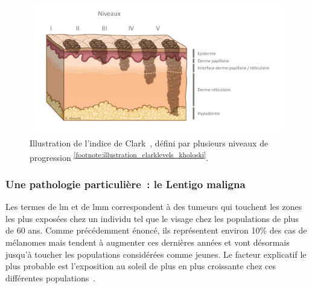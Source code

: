 \begin{figure}[H]
    \centering
    \includegraphics[width=0.9\linewidth]{contents/chapter_1/resources/illustration_clarklevels_kholoski.pdf}
    \caption{Illustration de l'indice de Clark~\cite{Clark1969}, défini par plusieurs niveaux de progression \textsuperscript{\ref{footnote:illustration_clarklevels_kholoski}}.}
    \label{fig:illustration_clarklevels_kholoski}
\end{figure}\par

\addtocounter{footnote}{1}

\subsubsection{Une pathologie particulière~: le Lentigo maligna}
\label{subsec:lentigo}
Les termes de \acrfull{lm} et de \acrfull{lmm} correspondent à des tumeurs qui touchent les zones les plus exposées chez un individu tel que le visage chez les populations de plus de 60 ans. Comme précédemment énoncé, ils représentent environ 10\% des cas de mélanomes mais tendent à augmenter ces dernières années et vont désormais jusqu'à toucher les populations considérées comme jeunes. Le facteur explicatif le plus probable est l'exposition au soleil de plus en plus croissante chez ces différentes populations~\cite{Baccard2009, LeGal2011, LeDuff2014}.\par

